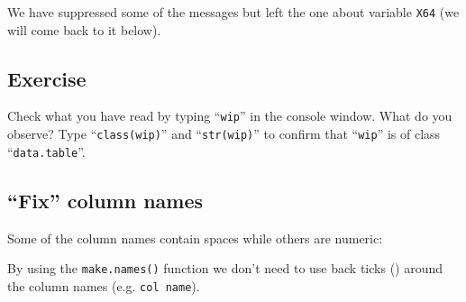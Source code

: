 \documentclass[a4paper,9pt,twocolumn,twoside,printwatermark=false]{pinp}
\begin{document}
We have suppressed some of the messages but left the one about variable
\texttt{X64} (we will come back to it below).

\subsection{Exercise}\label{exercise-1}

Check what you have read by typing ``\texttt{wip}'' in the console
window. What do you observe? Type ``\texttt{class(wip)}'' and
``\texttt{str(wip)}'' to confirm that ``\texttt{wip}'' is of class
``\texttt{data.table}''.

\subsection{\texorpdfstring{``Fix'' column
names}{Fix column names}}\label{fix-column-names}

Some of the column names contain spaces while others are numeric:

\begin{Shaded}
\begin{Highlighting}[]
\NormalTok{(}
\NormalTok{(}
\end{Highlighting}
\end{Shaded}

By using the \texttt{make.names()} function we don't need to use back
ticks (\texttt{\textasciigrave{}}) around the column names (e.g.
\texttt{\textasciigrave{}col\ name\textasciigrave{}}).

\begin{Shaded}
\begin{Highlighting}[]
\StringTok{ }\NormalTok{(}
\NormalTok{(}
\NormalTok{(}
\end{Highlighting}
\end{Shaded}
\end{document}

